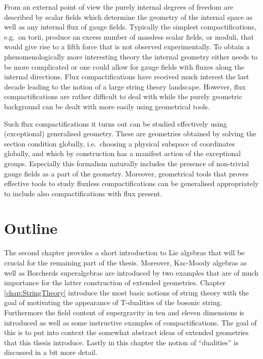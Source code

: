 From an external point of view the purely internal degrees of freedom are described by scalar fields which determine the geometry of the internal space as well as any internal flux of gauge fields. Typically the simplest compactifications, e.g.\ on torii, produce an excess number of massless scalar fields, or moduli, that would give rise to a fifth force that is not observed experimentally. To obtain a phenomenologically more interesting theory the internal geometry either needs to be more complicated or one could allow for gauge fields with fluxes along the internal directions. Flux compactifications \cite{Grana:2005jc} have received much interest the last decade leading to the notion of a large string theory landscape. However, flux compactifications are rather difficult to deal with while the purely geometric background can be dealt with more easily using geometrical tools. 

Such flux compactifications it turns out can be studied effectively using (exceptional) generalised geometry. These are geometries obtained by solving the section condition globally, i.e.\ choosing a physical subspace of coordinates globally, and which by construction has a manifest action of the exceptional groups. Especially this formalism naturally includes the presence of non-trivial gauge fields as a part of the geometry. Moreover, geometrical tools that proves effective tools to study fluxless compactifications can be generalised appropriately to include also compactifications with flux present. \cite{Grana:2009im,Grana:2016dyl,Coimbra:2012af,Ashmore:2015joa}

\section{Outline}
The second chapter provides a short introduction to Lie algebras that will be crucial for the remaining part of the thesis. Moreover, Kac-Moody algebras as well as Borcherds superalgebras are introduced by two examples that are of much importance for the latter construction of extended geometries. Chapter \ref{chap:StringTheory} introduce the most basic notions of string theory with the goal of motivating the appearance of T-dualities of the bosonic string. Furthermore the field content of supergravity in ten and eleven dimensions is introduced as well as some instructive examples of compactifications. The goal of this is to put into context the somewhat abstract ideas of extended geometries that this thesis introduce. Lastly in this chapter the notion of ``dualities'' is discussed in a bit more detail. 

